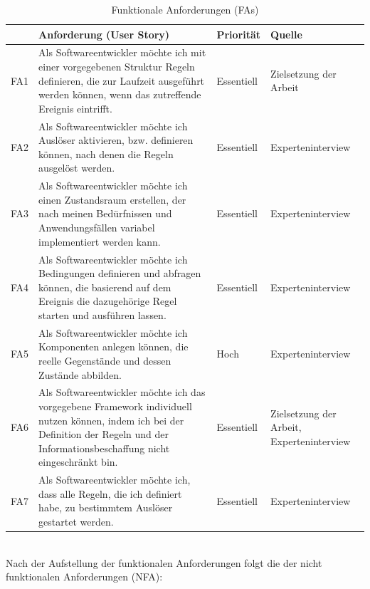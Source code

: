     \begin{table}[hbt!]
        \begin{center}
            \begin{tabular}{ | p{0.6cm} | p{9.5cm} | p{1.6cm} | p{3.1cm} | }
                \hline
                    \textbf{} & \textbf{Anforderung (User Story)} & \textbf{Priorität} & \textbf{Quelle} \\
                \hline
                    FA1 & Als Softwareentwickler möchte ich mit einer vorgegebenen Struktur Regeln definieren, die zur Laufzeit ausgeführt werden können, wenn das zutreffende Ereignis eintrifft. & Essentiell & Zielsetzung der Arbeit \\
                \hline
                    FA2 & Als Softwareentwickler möchte ich Auslöser aktivieren, bzw. definieren können, nach denen die Regeln ausgelöst werden. & Essentiell & Experteninterview \\
                \hline
                    FA3 & Als Softwareentwickler möchte ich einen Zustandsraum erstellen, der nach meinen Bedürfnissen und Anwendungsfällen variabel implementiert werden kann. & Essentiell & Experteninterview \\ 
                \hline
                    FA4 & Als Softwareentwickler möchte ich Bedingungen definieren und abfragen können, die basierend auf dem Ereignis die dazugehörige Regel starten und ausführen lassen. & Essentiell & Experteninterview \\ 
                \hline
                    FA5 & Als Softwareentwickler möchte ich Komponenten anlegen können, die reelle Gegenstände und dessen Zustände abbilden. & Hoch & Experteninterview \\
                \hline
                    FA6 & Als Softwareentwickler möchte ich das vorgegebene Framework individuell nutzen können, indem ich bei der Definition der Regeln und der Informationsbeschaffung nicht eingeschränkt bin. & Essentiell & Zielsetzung der Arbeit, Experteninterview \\
                \hline
                    FA7 & Als Softwareentwickler möchte ich, dass alle Regeln, die ich definiert habe, zu bestimmtem Auslöser gestartet werden. & Essentiell & Experteninterview \\ 
                \hline
            \end{tabular}
        \end{center}
        \caption{Funktionale Anforderungen (FAs)}
        \label{tab:functionalRequirements}
    \end{table}
    \\
    Nach der Aufstellung der funktionalen Anforderungen folgt die der nicht funktionalen Anforderungen (NFA):
   